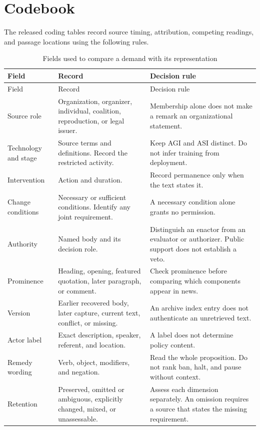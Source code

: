 \documentclass[11pt]{article}
\renewcommand{\arraystretch}{1.08}
\begin{document}
\section{Codebook}
\label{app:codebook}
The released coding tables record source timing, attribution, competing readings, and passage locations using the following rules.

\begingroup\small
\renewcommand{\arraystretch}{1.03}
\begin{longtable}{P{0.17\textwidth}P{0.36\textwidth}P{0.38\textwidth}}
\caption{Fields used to compare a demand with its representation}\\
\toprule Field & Record & Decision rule\\\midrule
\endfirsthead
\toprule Field & Record & Decision rule\\\midrule
\endhead
\bottomrule\endfoot
Source role & Organization, organizer, individual, coalition, reproduction, or legal issuer. & Membership alone does not make a remark an organizational statement.\\
Technology and stage & Source terms and definitions. Record the restricted activity. & Keep AGI and ASI distinct. Do not infer training from deployment.\\
Intervention & Action and duration. & Record permanence only when the text states it.\\
Change conditions & Necessary or sufficient conditions. Identify any joint requirement. & A necessary condition alone grants no permission.\\
Authority & Named body and its decision role. & Distinguish an enactor from an evaluator or authorizer. Public support does not establish a veto.\\
Prominence & Heading, opening, featured quotation, later paragraph, or comment. & Check prominence before comparing which components appear in news.\\
Version & Earlier recovered body, later capture, current text, conflict, or missing. & An archive index entry does not authenticate an unretrieved text.\\
Actor label & Exact description, speaker, referent, and location. & A label does not determine policy content.\\
Remedy wording & Verb, object, modifiers, and negation. & Read the whole proposition. Do not rank ban, halt, and pause without context.\\
Retention & Preserved, omitted or ambiguous, explicitly changed, mixed, or unassessable. & Assess each dimension separately. An omission requires a source that states the missing requirement.\\

\end{longtable}
\end{document}
